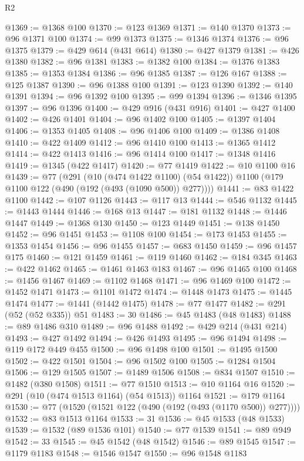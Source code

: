\begin{lexlean}{R2}
\begin{coremodule}
@1369 := @1368 @100
@1370 := @123 @1369
@1371 := @140 @1370
@1373 := @96 @1371 @100
@1374 := @99 @1373
@1375 := @1346 @1374
@1376 := @96 @1375
@1379 := @429 @614 (@431 @614)
@1380 := @427 @1379
@1381 := @426 @1380
@1382 := @96 @1381
@1383 := @1382 @100
@1384 := @1376 @1383
@1385 := @1353 @1384
@1386 := @96 @1385
@1387 := @126 @167
@1388 := @125 @1387
@1390 := @96 @1388 @100
@1391 := @123 @1390
@1392 := @140 @1391
@1394 := @96 @1392 @100
@1395 := @99 @1394
@1396 := @1346 @1395
@1397 := @96 @1396
@1400 := @429 @916 (@431 @916)
@1401 := @427 @1400
@1402 := @426 @1401
@1404 := @96 @1402 @100
@1405 := @1397 @1404
@1406 := @1353 @1405
@1408 := @96 @1406 @100
@1409 := @1386 @1408
@1410 := @422 @1409
@1412 := @96 @1410 @100
@1413 := @1365 @1412
@1414 := @422 @1413
@1416 := @96 @1414 @100
@1417 := @1348 @1416
@1419 := @1345 (@422 @1417)
@1420 := @77 @1419
@1422 := @10 @1100 @16
@1439 := @77
    (@291
      (@10 (@474 @1422 @1100) (@54 @1422))
      @1100
      (@179 @1100 @122 (@490 (@192 (@493 (@1090 @500)) @277))))
@1441 := @83 @1422 @1100
@1442 := @107 @1126
@1443 := @117 @13
@1444 := @546 @1132
@1445 := @1443 @1444
@1446 := @168 @13
@1447 := @181 @1132
@1448 := @1446 @1447
@1449 := @1368 @130
@1450 := @123 @1449
@1451 := @138 @1450
@1452 := @96 @1451
@1453 := @1108 @100
@1454 := @173 @1453
@1455 := @1353 @1454
@1456 := @96 @1455
@1457 := @683 @1450
@1459 := @96 @1457 @175
@1460 := @121 @1459
@1461 := @119 @1460
@1462 := @184 @345
@1463 := @422 @1462
@1465 := @1461 @1463 @183
@1467 := @96 @1465 @100
@1468 := @1456 @1467
@1469 := @1102 @1468
@1471 := @96 @1469 @100
@1472 := @1452 @1471
@1473 := @1101 @1472
@1474 := @1448 @1473
@1475 := @1445 @1474
@1477 := @1441 (@1442 @1475)
@1478 := @77 @1477
@1482 := @291 (@52 (@52 @335)) @51
@1483 := 30
@1486 := @45 @1483 (@48 @1483)
@1488 := @89 @1486 @310
@1489 := @96 @1488
@1492 := @429 @214 (@431 @214)
@1493 := @427 @1492
@1494 := @426 @1493
@1495 := @96 @1494
@1498 := @119 @172 @449 @455
@1500 := @96 @1498 @100
@1501 := @1495 @1500
@1502 := @422 @1501
@1504 := @96 @1502 @100
@1505 := @1284 @1504
@1506 := @129 @1505
@1507 := @1489 @1506
@1508 := @834 @1507
@1510 := @1482 (@380 @1508)
@1511 := @77 @1510
@1513 := @10 @1164 @16
@1520 := @291 (@10 (@474 @1513 @1164) (@54 @1513)) @1164
@1521 := @179 @1164
@1530 := @77 (@1520 (@1521 @122 (@490 (@192 (@493 (@1170 @500)) @277))))
@1532 := @83 @1513 @1164
@1533 := 31
@1536 := @45 @1533 (@48 @1533)
@1539 := @1532 (@89 @1536 @101)
@1540 := @77 @1539
@1541 := @89 @949
@1542 := 33
@1545 := @45 @1542 (@48 @1542)
@1546 := @89 @1545
@1547 := @1179 @1183
@1548 := @1546 @1547
@1550 := @96 @1548 @1183

\end{coremodule}
\end{lexlean}
